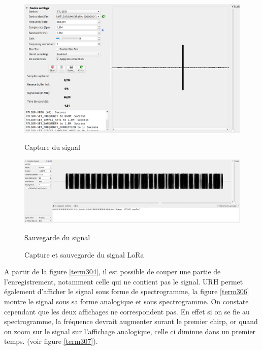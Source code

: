 \begin{figure}[h]
    \centering
    \begin{minipage}[t]{\textwidth}
        \centering
        \includegraphics[width=\textwidth]{images/urh2n.png}
        \caption{Capture du signal}
        \label{term303}
    \end{minipage}
    
    \vspace{1cm}
    
    \begin{minipage}[t]{\textwidth}
        \centering
        \includegraphics[width=\textwidth]{images/urh3n.png}
        \caption{Sauvegarde du signal}
        \label{term304}
    \end{minipage}
    \caption{Capture et sauvegarde du signal LoRa}
    \label{term305}
\end{figure}

A partir de la figure \ref{term304}, il est possible de couper une partie de l'enregistrement, notamment celle qui ne contient pas le signal. URH permet également d'afficher le signal sous forme de spectrogramme, la figure \ref{term306} montre le signal sous sa forme analogique et sous spectrogramme. On constate cependant que les deux affichages ne correspondent pas. En effet si on se fie au spectrogramme, la fréquence devrait augmenter surant le premier chirp, or quand on zoom sur le signal sur l'affichage analogique, celle ci diminue dans un premier temps. (voir figure \ref{term307}).

